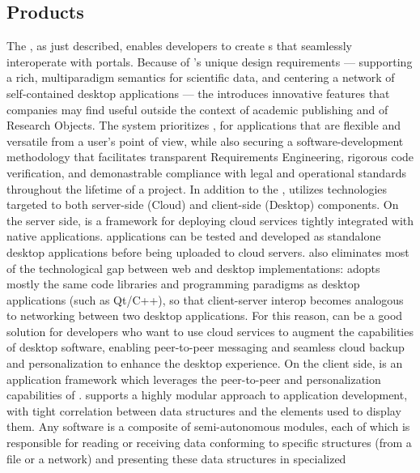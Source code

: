 \documentclass[10pt,letterpaper]{article}
\begin{document}
\subsection{{\lMOSAIC} Products}
The {\MOSAIC} {\SDK}, as just described, enables 
developers to create {\RO}s that 
seamlessly interoperate with {\MOSAIC} 
portals.  Because of {\MOSAIC}'s unique design 
requirements --- supporting a 
rich, multiparadigm semantics for scientific data,  
and centering a network of self-contained 
desktop applications --- the {\MOSAIC} {\SDK} 
introduces innovative features that companies may 
find useful outside the context of academic 
publishing and of Research Objects.  
The {\MOSAIC} system  
prioritizes , for applications 
that are flexible and versatile 
from a user's point of view, 
while also securing a software-development methodology 
that facilitates transparent Requirements 
Engineering, rigorous code verification, 
and demonastrable compliance with 
legal and operational standards throughout the 
lifetime of a project.
\p{}
In addition to the {\SDK}, {\MOSAIC} utilizes technologies 
targeted to both server-side (Cloud) 
and client-side (Desktop) components.  On the 
server side, {\NDPCloud} is a framework for deploying 
cloud services tightly integrated with native applications.  
{\NDPCloud} applications can be tested and 
developed as standalone desktop applications before 
being uploaded to cloud servers.  
{\NDPCloud} also eliminates most of the technological 
gap between web and desktop implementations:   
{\NDPCloud} adopts mostly the same code libraries 
and programming paradigms as 
desktop applications (such as Qt/C++), 
so that client-server interop 
becomes analogous to networking between two 
desktop applications.  For this reason, {\NDPCloud} 
can be a good solution for developers who want to 
use cloud services to augment the capabilities 
of desktop software, enabling peer-to-peer 
messaging and seamless cloud backup and 
personalization to enhance the desktop experience.
\p{}
On the client side, {\VersatileUX} is an {\GUI} 
application framework which leverages 
the peer-to-peer and personalization 
capabilities of {\NDPCloud}.  {\VersatileUX} 
supports a highly modular approach to 
application development, with tight 
correlation between data structures and the {\GUI} 
elements used to display them.  Any {\VersatileUX} 
software is a composite of semi-autonomous  
modules, each of which is responsible for 
reading or receiving data conforming 
to specific structures (from a file or a network) 
and presenting these data structures in specialized 
\end{document}
